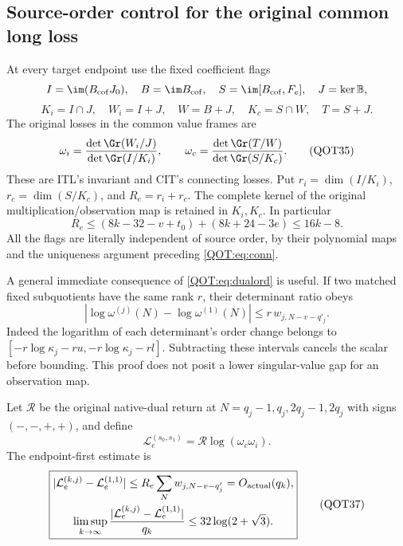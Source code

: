 \documentclass[11pt,a4paper]{article}
\begin{document}
\subsection{Source-order control for the original common long loss}
At every target endpoint use the fixed coefficient flags
\[
 I=\im(B_{\rm cof}J_0),\quad B=\im B_{\rm cof},\quad
 S=\im[B_{\rm cof},F_e],\quad J=\ker\mathbb B,
\]
\[
 K_i=I\cap J,\quad W_i=I+J,\quad W=B+J,\quad
 K_c=S\cap W,\quad T=S+J.
\]
The original losses in the common value frames are
\begin{equation}
 \omega_i=\frac{\det\Gr(W_i/J)}{\det\Gr(I/K_i)},\qquad
 \omega_c=\frac{\det\Gr(T/W)}{\det\Gr(S/K_c)}.
 \label{QOT:eq:loss}
\tag{QOT35}
\end{equation}
These are ITL's invariant and CIT's connecting losses. Put $r_i=\dim(I/K_i)$, $r_c=\dim(S/K_c)$, and $R_e=r_i+r_c$. The complete kernel of the original multiplication/observation map is retained in $K_i,K_c$. In particular
\[
 R_e\le(8k-32-v+t_0)+(8k+24-3e)\le16k-8.
\]
All the flags are literally independent of source order, by their polynomial maps and the uniqueness argument preceding \eqref{QOT:eq:conn}.

A general immediate consequence of \eqref{QOT:eq:dualord} is useful. If two matched fixed subquotients have the same rank $r$, their determinant ratio obeys
\begin{equation}
 \left|\log\omega^{(j)}(N)-\log\omega^{(1)}(N)\right|
 \le r\,w_{j,N-v-q'_j}.
 \label{QOT:eq:ratcompare}
\tag{QOT36}
\end{equation}
Indeed the logarithm of each determinant's order change belongs to $[-r\log\kappa_j-ru,-r\log\kappa_j-rl]$. Subtracting these intervals cancels the scalar before bounding. This proof does not posit a lower singular-value gap for an observation map.

Let $\mathcal R$ be the original native-dual return at $N=q_j-1,q_j,2q_j-1,2q_j$ with signs $(-,-,+,+)$, and define
\[
 \mathcal L_e^{(s_0,s_1)}=\mathcal R\log(\omega_c\omega_i).
\]
The endpoint-first estimate is
\begin{equation}
\boxed{\begin{gathered}
 |\mathcal L_e^{(k,j)}-\mathcal L_e^{(1,1)}|
 \le R_e\sum_N w_{j,N-v-q'_j}=O_{\rm actual}(q_k),\\
 \limsup_{k\to\infty}\frac{|\mathcal L_e^{(k,j)}-\mathcal L_e^{(1,1)}|}{q_k}
 \le32\log(2+\sqrt3).
\end{gathered}}
\label{QOT:eq:long}
\tag{QOT37}
\end{equation}
\end{document}
